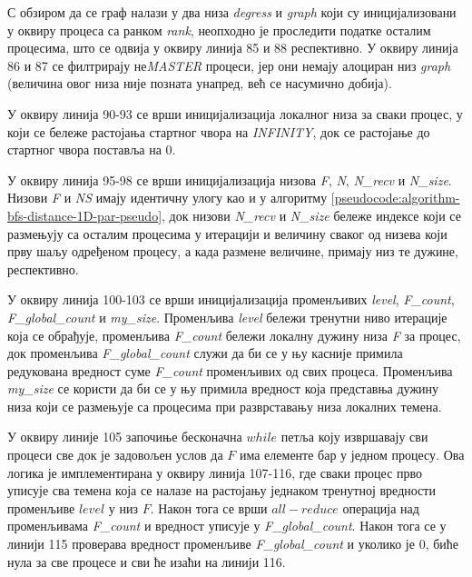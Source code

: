 \par
С обзиром да се граф налази у два низа \textit{degress} и \textit{graph} који су иницијализовани у оквиру процеса са ранком \textit{rank}, неопходно је проследити податке осталим процесима, што се одвија у оквиру линија 85 и 88 респективно. У оквиру линија 86 и 87 се филтрирају не\textit{MASTER} процеси, јер они немају алоциран низ \textit{graph} (величина овог низа није позната унапред, већ се насумично добија).

\par
У оквиру линија 90-93 се врши иницијализација локалног низа за сваки процес, у који се бележе растојања стартног чвора на \textit{INFINITY}, док се растојање до стартног чвора поставља на $0$.

\par
У оквиру линија 95-98 се врши иницијализација низова \textit{F}, \textit{N}, \textit{N\_recv} и \textit{N\_size}. Низови \textit{F} и \textit{NS} имају идентичну улогу као и у алгоритму \ref{pseudocode:algorithm-bfs-distance-1D-par-pseudo}, док низови \textit{N\_recv} и \textit{N\_size} бележе индексе који се размењују са осталим процесима у итерацији и величину сваког од низева који прву шаљу одређеном процесу, а када размене величине, примају низ те дужине, респективно.

\par
У оквиру линија 100-103 се врши иницијализација променљивих \textit{level}, \textit{F\_count}, \textit{F\_global\_count} и \textit{my\_size}. Променљива \textit{level} бележи тренутни ниво итерације која се обрађује, променљива \textit{F\_count} бележи локалну дужину низа \textit{F} за процес, док променљива \textit{F\_global\_count} служи да би се у њу касније примила редукована вредност суме \textit{F\_count} променљивих од свих процеса. Променљива \textit{my\_size} се користи да би се у њу примила вредност која представња дужину низа који се размењује са процесима при разврставању низа локалних темена.

\par
У оквиру линије 105 започиње бесконачна $while$ петља коју извршавају сви процеси све док је задовољен услов да $F$ има елементе бар у једном процесу. Ова логика је имплементирана у оквиру линија 107-116, где сваки процес прво уписује сва темена која се налазе на растојању једнаком тренутној вредности променљиве $level$ у низ $F$. Након тога се врши $all-reduce$ операција над променљивама \textit{F\_count} и вредност уписује у \textit{F\_global\_count}. Након тога се у линији 115 проверава вредност променљиве \textit{F\_global\_count} и уколико је $0$, биће нула за све процесе и сви ће изаћи на линији 116.


